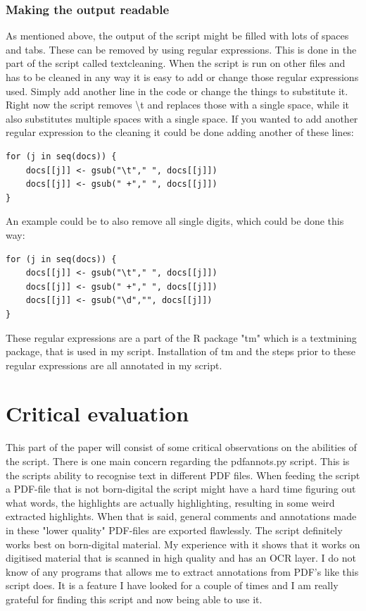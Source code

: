 \documentclass{article}
\begin{document}
\subsubsection{Making the output readable}
As mentioned above, the output of the script might be filled with lots of spaces and tabs. These can be removed by using regular expressions. This is done in the part of the script called textcleaning. When the script is run on other files and has to be cleaned in any way it is easy to add or change those regular expressions used. Simply add another line in the code or change the things to substitute it. Right now the script removes \textbackslash t and replaces those with a single space, while it also substitutes multiple spaces with a single space. If you wanted to add another regular expression to the cleaning it could be done adding another of these lines:
\begin{verbatim}
for (j in seq(docs)) {
    docs[[j]] <- gsub("\t"," ", docs[[j]]) 
    docs[[j]] <- gsub(" +"," ", docs[[j]])
}
\end{verbatim}
An example could be to also remove all single digits, which could be done this way:
\begin{verbatim}
for (j in seq(docs)) {
    docs[[j]] <- gsub("\t"," ", docs[[j]]) 
    docs[[j]] <- gsub(" +"," ", docs[[j]])
    docs[[j]] <- gsub("\d","", docs[[j]])
} 
\end{verbatim}
These regular expressions are a part of the R package "tm" which is a textmining package, that is used in my script. Installation of tm and the steps prior to these regular expressions are all annotated in my script. 

\section{Critical evaluation}
This part of the paper will consist of some critical observations on the abilities of the script. There is one main concern regarding the pdfannots.py script. This is the scripts ability to recognise text in different PDF files. When feeding the script a PDF-file that is not born-digital the script might have a hard time figuring out what words, the highlights are actually highlighting, resulting in some weird extracted highlights. When that is said, general comments and annotations made in these "lower quality" PDF-files are exported flawlessly. The script definitely works best on born-digital material. My experience with it shows that it works on digitised material that is scanned in high quality and has an OCR layer.\newline
I do not know of any programs that allows me to extract annotations from PDF's like this script does. It is a feature I have looked for a couple of times and I am really grateful for finding this script and now being able to use it.
\end{document}
